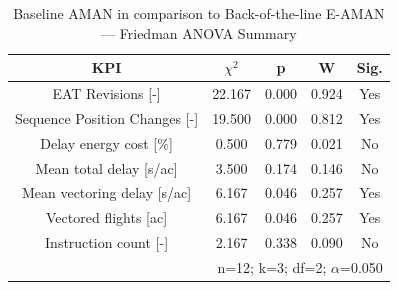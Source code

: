 \begin{table}[!t]
\caption{Baseline AMAN in comparison to Back-of-the-line E-AMAN — Friedman ANOVA Summary}
\begin{center}
\footnotesize
\setlength{\tabcolsep}{3pt}
\renewcommand{\arraystretch}{1.000}
\begin{tabular}{|c|c|c|c|c|}
\hline
\textbf{KPI} & \textbf{$\chi^2$} & \textbf{p} & \textbf{W} & \textbf{Sig.} \\
\hline
EAT Revisions [-] & 22.167 & 0.000 & 0.924 & Yes \\
\hline
Sequence Position Changes [-] & 19.500 & 0.000 & 0.812 & Yes \\
\hline
Delay energy cost [\%] & 0.500 & 0.779 & 0.021 & No \\
\hline
Mean total delay [s/ac] & 3.500 & 0.174 & 0.146 & No \\
\hline
Mean vectoring delay [s/ac] & 6.167 & 0.046 & 0.257 & Yes \\
\hline
Vectored flights [ac] & 6.167 & 0.046 & 0.257 & Yes \\
\hline
Instruction count [-] & 2.167 & 0.338 & 0.090 & No \\
\hline
\multicolumn{5}{r}{n=12; k=3; df=2; $\alpha$=0.050}\\
\end{tabular}
\label{tab:baseline\_aman\_in\_comparison\_to\_back-of-the-line\_e-aman\_friedman}
\end{center}
\end{table}